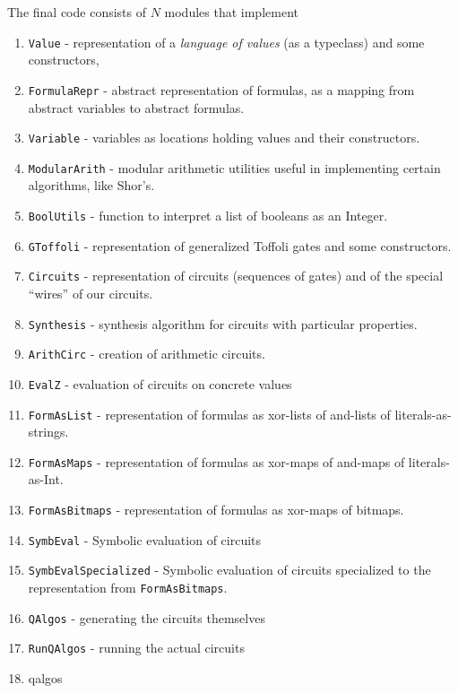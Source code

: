 \documentclass[sigplan]{acmart}
\begin{document}
The final code consists of $N$ modules that implement
\begin{enumerate}
  \item \texttt{Value} - representation of a \emph{language of values}
    (as a typeclass) and some constructors,
  \item \texttt{FormulaRepr} - abstract representation of formulas, as
    a mapping from abstract variables to abstract formulas.
  \item \texttt{Variable} - variables as locations holding values and
    their constructors.
  \item \texttt{ModularArith} - modular arithmetic utilities useful in
    implementing certain algorithms, like Shor's.
  \item \texttt{BoolUtils} - function to interpret a list of booleans as
    an Integer.
  \item \texttt{GToffoli} - representation of generalized Toffoli gates
    and some constructors.
  \item \texttt{Circuits} - representation of circuits (sequences of gates)
    and of the special ``wires'' of our circuits.
  \item \texttt{Synthesis} - synthesis algorithm for circuits with particular
    properties.
  \item \texttt{ArithCirc} - creation of arithmetic circuits.
  \item \texttt{EvalZ} - evaluation of circuits on concrete values
  \item \texttt{FormAsList} - representation of formulas as xor-lists 
    of and-lists of literals-as-strings.
  \item \texttt{FormAsMaps} - representation of formulas as xor-maps
    of and-maps of literals-as-Int.
  \item \texttt{FormAsBitmaps} - representation of formulas as xor-maps
    of bitmaps.
  \item \texttt{SymbEval} - Symbolic evaluation of circuits
  \item \texttt{SymbEvalSpecialized} - Symbolic evaluation of circuits
    specialized to the representation from \texttt{FormAsBitmaps}.
  \item \texttt{QAlgos} - generating the circuits themselves
  \item \texttt{RunQAlgos} - running the actual circuits
  \item qalgos
\end{enumerate}

\end{document}
